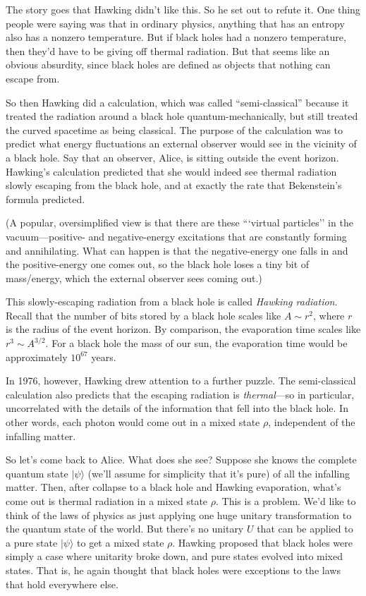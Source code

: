\documentclass[12pt]{report}
\theoremstyle{plain}
\theoremstyle{definition}
\renewcommand{\ket}[1]{|#1\rangle}
\begin{document}
The story goes that Hawking didn't like this. So he set out to refute it.
One thing people were saying was that in
ordinary physics, anything that has an entropy also has
a nonzero temperature.  But if black holes had a nonzero temperature,
then they'd have to be giving off
thermal radiation.  But that seems like an obvious absurdity, since
black holes are defined as objects that nothing can escape from.

So then Hawking
did a calculation, which was called ``semi-classical''
because it treated the radiation around a black hole quantum-mechanically, but still
treated the curved spacetime as being classical.  The purpose of the
calculation was to predict what energy fluctuations an external observer would see in the vicinity of a black hole.
Say that an observer, Alice, is sitting outside the event horizon.
Hawking's calculation predicted that she would indeed see thermal radiation
slowly escaping from the black hole, and at exactly the
rate that Bekenstein's formula predicted.

(A popular, oversimplified view is that there are these
```virtual particles'' in the vacuum---positive- and negative-energy excitations
that are constantly forming and annihilating.  What can happen is that the negative-energy one falls in and the positive-energy one comes out, so the
black hole loses a tiny bit of mass/energy, which the external observer
sees coming out.)

This slowly-escaping radiation from a black hole is
called {\em Hawking radiation}.
Recall that the number of bits stored by a black hole scales like $A \sim r^2$, where $r$ is the radius of the event horizon.
By comparison, the evaporation time scales like $r^3 \sim A^{3/2}$.  For a black hole the mass of our sun, the evaporation time
would be approximately $10^{67}$ years.

In 1976, however, Hawking drew attention to a further puzzle.
The semi-classical calculation also predicts that the escaping radiation
is {\em thermal}---so in particular, uncorrelated with the details of the information that fell into the
black hole.
In other words, each photon would come out in a mixed state $\rho$,
independent of the infalling matter.

So let's come back to Alice. What does she see? Suppose she knows the complete
quantum state %
$\ket{\psi}$ (we'll assume for simplicity that it's pure)
of all the infalling matter.  Then, after collapse to a black hole and Hawking evaporation,
what's come out is thermal radiation in a mixed state ${\rho}$.
This is a problem.
We'd like to think of the laws of physics as just applying one huge unitary transformation to the quantum
state of the world. But there's no unitary $U$
that can be applied to a pure state $\ket{\psi}$ to get a mixed state ${\rho}$.
Hawking proposed that black holes were simply a case where unitarity broke down, and pure states
evolved into mixed states.  That is, he again thought that
black holes were exceptions to the laws that hold everywhere else.
\end{document}
